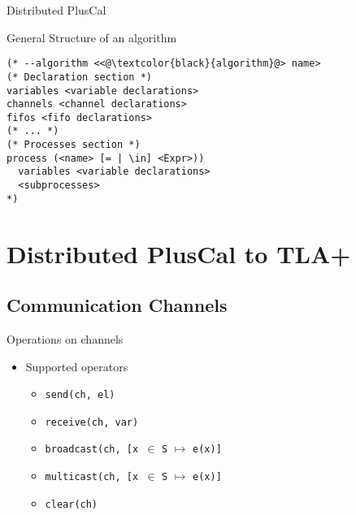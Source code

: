 \documentclass{beamer}
\begin{document}
\begin{frame}[fragile]{Distributed PlusCal}
\begin{exampleblock}{General Structure of an algorithm}
\begin{lstlisting}[language=pluscal, frame = none, numbers = none]
(* --algorithm <<@\textcolor{black}{algorithm}@> name>
(* Declaration section *)
variables <variable declarations>
channels <channel declarations>
fifos <fifo declarations>
(* ... *)
(* Processes section *)
process (<name> [= | \in] <Expr>))
  variables <variable declarations>
  <subprocesses>
*)
\end{lstlisting}
\end{exampleblock}
\end{frame}

\section{Distributed PlusCal to TLA+}

\subsection{Communication Channels}

\begin{frame}[fragile]{Operations on channels}
    \begin{itemize}
     \item Supported operators 
        \begin{itemize}
        \item \verb|send(ch, el)|
        \item \verb|receive(ch, var)|
        \item \verb|broadcast(ch, [x |$\in$ \verb|S| $\mapsto$ \verb|e(x)]|
        \item \verb|multicast(ch, [x |$\in$ \verb|S| $\mapsto$ \verb|e(x)]|
        \item \verb|clear(ch)|
    \end{itemize}
    \end{itemize}
\end{frame}
\end{document}
